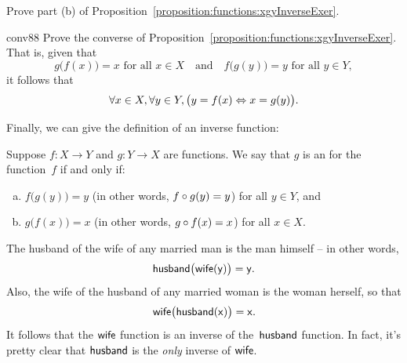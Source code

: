 \begin{exercise}{88}
Prove part (b) of Proposition~\ref{proposition:functions:xgyInverseExer}.
\end{exercise}
 

\begin{exercise}{conv88}  Prove the converse of Proposition~\ref{proposition:functions:xgyInverseExer}. That is, given that 
\[g \bigl( f(x) \bigr) = x \text{ for all } x \in X \quad \text{and} \quad f \bigl( g(y) \bigr) = y \text{ for all }y \in Y,\]
it follows that 
\[ \forall x \in X, \forall y \in Y, \bigl(y = f(x) \Leftrightarrow x = g(y) \bigr). \]
\end{exercise}

Finally, we can give the definition of an inverse function:

 \begin{defn}\label{def:invfna}
 Suppose  $f \colon X \to Y$  and $g \colon Y \to X$ are functions.
We say that $g$ is an  for the function~$f$ if and only if:
 \begin{enumerate}[(a)]
 \item $f \bigl( g(y) \bigr) = y$  (in other words, $f \circ g(y) = y$) for all $y \in Y$,
 and
 \item $g \bigl( f(x) \bigr) = x$ (in other words, $g \circ f(x) = x$) for all $x \in X$.
 \end{enumerate}
 \end{defn}
 

 \begin{example}{}
The husband of the wife of any married man is the man himself -- in other words,
$$ \sf{husband}\bigl( \sf{wife} (y) \bigr) = y. $$
Also, the wife of the husband of any married woman is the woman herself, so that
$$ \sf{wife}\bigl( \sf{husband} (x) \bigr) = x . $$
It follows that
the $\sf{wife}$ function is an inverse of the~$\sf{husband}$ function. In fact, it's pretty clear that $\sf{husband}$ is the \emph{only} inverse of $\sf{wife}$.
\end{example}
 

